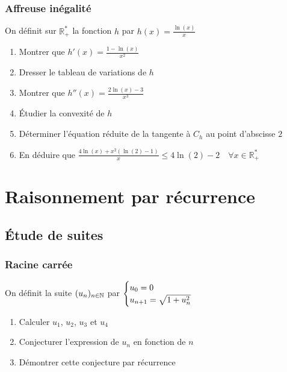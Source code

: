 \documentclass[oneside,12pt]{book}          %
\begin{document}
\subsection{Affreuse inégalité}
On définit sur $\mathbb{R}^*_+$ la fonction $h$ par $h(x) = \frac{\ln(x)}{x}$
\begin{enumerate}
    \item Montrer que $h'(x) = \frac{1 - \ln(x)}{x^2}$
    \item Dresser le tableau de variations de $h$
    \item Montrer que $h''(x) = \frac{2 \ln(x) - 3}{x^3}$
    \item Étudier la convexité de $h$
    \item Déterminer l'équation réduite de la tangente à $C_h$ au point d'abscisse $2$
    \item En déduire que $\frac{4 \ln(x) + x^2 (\ln(2) - 1)}{x} \leq 4\ln(2)-2 \quad \forall x \in \mathbb{R}^*_+$
\end{enumerate}




\chapter{Raisonnement par récurrence}
\newpage

\section{Étude de suites}


\subsection{Racine carrée}
On définit la suite ${(u_{n})_{n\in\mathbb N}}$ par $\defsuite{u_0=0}{\sqrt{1+u_n^2}}$ 
\begin{enumerate}
    \item Calculer $u_1$, $u_2$, $u_3$ et $u_4$
    \item Conjecturer l'expression de $u_n$ en fonction de $n$
    \item Démontrer cette conjecture par récurrence
\end{enumerate}
\end{document}
